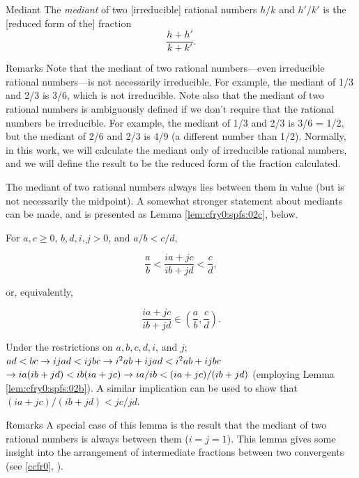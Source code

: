 \begin{vworkdefinitionstatementpar}{Mediant}
\label{def:cfry0:spfs:02}
The \emph{mediant} of two [irreducible] rational numbers
$h/k$ and $h'/k'$ is the [reduced form of the] fraction
\begin{equation}
\frac{h+h'}{k+k'} .
\end{equation}
\end{vworkdefinitionstatementpar}
\begin{vworkdefinitionparsection}{Remarks}
Note that the mediant of two rational numbers---even
irreducible rational numbers---is not necessarily irreducible.
For example, the mediant of 1/3 and 2/3 is 3/6, which is
not irreducible.  Note also that the mediant of two rational
numbers is ambiguously defined if we don't require that the 
rational numbers be irreducible.  For example, 
the mediant of 1/3 and 2/3 is 3/6 = 1/2, but the
mediant of 2/6 and 2/3 is 4/9 (a different number than
1/2).  Normally, in this work, we will calculate the mediant
only of irreducible rational numbers, and we will define
the result to be the reduced form of the fraction calculated.
\end{vworkdefinitionparsection}
\vworkdefinitionfooter{}

The mediant of two rational numbers always lies between them in value (but
is not necessarily the midpoint).  A somewhat stronger
statement about mediants can be made, and is 
presented as Lemma \ref{lem:cfry0:spfs:02c}, below.

\begin{vworklemmastatement}
\label{lem:cfry0:spfs:02c}
For 
$a,c \geq 0$,
$b,d,i,j > 0$, and
$a/b < c/d$,

\begin{equation}
\frac{a}{b} < \frac{ia + jc}{ib + jd} < \frac{c}{d} ,
\end{equation}

or, equivalently,

\begin{equation}
\frac{ia + jc}{ib + jd} \in \left( { \frac{a}{b} , \frac{c}{d} } \right) .
\end{equation}

\end{vworklemmastatement}
\begin{vworklemmaproof}
Under the restrictions on $a,b,c,d,i$, and $j$;
$ad < bc \to ijad < ijbc \to i^2ab+ijad < i^2ab + ijbc$
$\to ia(ib+jd) < ib(ia+jc) \to ia/ib < (ia+jc)/(ib+jd)$
(employing Lemma \ref{lem:cfry0:spfs:02b}).  A similar implication
can be used to show that $(ia+jc)/(ib+jd) < jc/jd$.
\end{vworklemmaproof}
\begin{vworklemmaparsection}{Remarks}
A special case of this lemma is the result that the mediant of two
rational numbers is always between them ($i=j=1$).  This lemma gives
some insight into the arrangement of 
intermediate fractions
between
two convergents
(see \ccfrzeroxrefcomma{}\ccfrzeromcclass{} \ref{ccfr0}, 
\emph{\ccfrzeroshorttitle{}}).
\end{vworklemmaparsection}

